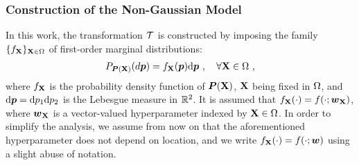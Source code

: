 \subsubsection{Construction of the Non-Gaussian Model}
\label{section: Chapter4/theory/stochastic/non_gaussian_model}

In this work, the transformation $\mathcal{T}$ is constructed by imposing the family $\{f_{\textbf{X}}\}_{\textbf{X}\in\Omega}$ of first-order marginal distributions:
\begin{align}
  P_{\boldsymbol{P}(\textbf{X})}(d\boldsymbol{p}) = f_{\textbf{X}}(\boldsymbol{p})\mathrm{d}\boldsymbol{p}~, \quad \forall \textbf{X} \in \Omega~,
\end{align}
where $f_{\textbf{X}}$ is the probability density function of $\boldsymbol{P}(\textbf{X})$, $\textbf{X}$ being fixed in $\Omega$, and $\mathrm{d}\boldsymbol{p}=\mathrm{d}p_1\mathrm{d}p_2$ is the Lebesgue measure in $\mathbb{R}^2$. It is assumed that $f_{\textbf{X}}(\cdot) = f(\cdot; \boldsymbol{w}_{\textbf{X}})$, where $\boldsymbol{w}_{\textbf{X}}$ is a vector-valued hyperparameter indexed by $\textbf{X} \in \Omega$. In order to simplify the analysis, we assume from now on that the aforementioned hyperparameter does not depend on location, and we write $f_{\textbf{X}}(\cdot) = f(\cdot; \boldsymbol{w})$ using a slight abuse of notation.

